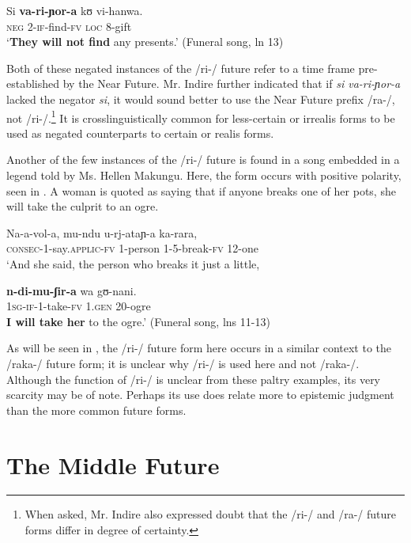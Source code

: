 \documentclass[output=paper]{langsci/langscibook}
\begin{document}
\ea\label{ex:sarvasy:10}
\gll Si   \textbf{va-ri-ɲor-a}   kʊ   vi-hanwa. \\
\textsc{neg}  2-\textsc{if-}find-\textsc{fv}  \textsc{loc}  8-gift \\
\glt ‘\textbf{They will not find} any presents.’ (Funeral song, ln 13)
\z

Both of these negated instances of the /ri-/ future refer to a time frame pre-established by the Near Future. Mr. Indire further indicated that if \textit{si va-ri-ɲor-a} lacked the negator \textit{si}, it would sound better to use the Near Future prefix /ra-/, not /ri-/.\footnote{When asked, Mr. Indire also expressed doubt that the /ri-/ and /ra-/ future forms differ in degree of certainty.} It is crosslinguistically common for less-certain or irrealis forms to be used as negated counterparts to certain or realis forms. 

Another of the few instances of the /ri-/ future is found in a song embedded in a legend told by Ms. Hellen Makungu. Here, the form occurs with positive polarity, seen in . A woman is quoted as saying that if anyone breaks one of her pots, she will take the culprit to an ogre.

\ea\label{ex:sarvasy:11}
\gll Na-a-vol-a,      mu-ndu  u-rj-ataɲ-a  ka-rara, \\
\textsc{consec-1}-say.\textsc{applic-fv}  1-person  1-5-break-\textsc{fv}  12-one \\
\glt ‘And she said, the person who breaks it just a little,

\gll \textbf{n-di-mu-ʃir-a}     wa   gʊ-nani. \\
\textsc{1sg-if-}1-take-\textsc{fv}  \textsc{1.gen}  20-ogre \\
\glt \textbf{I will take her} to the ogre.’ (Funeral song, lns 11-13)
\z

As will be seen in , the /ri-/ future form here occurs in a similar context to the /raka-/ future form; it is unclear why /ri-/ is used here and not /raka-/. Although the function of /ri-/ is unclear from these paltry examples, its very scarcity may be of note. Perhaps its use does relate more to epistemic judgment than the more common future forms.

\section{The Middle Future}
\end{document}
